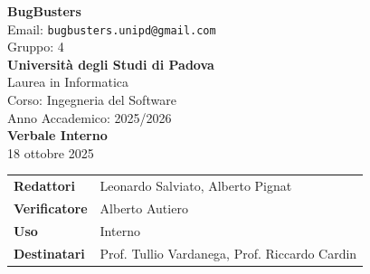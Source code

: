 \documentclass[a4paper,12pt]{article}
\begin{document}
\begin{center}  
  
  {\Large\bfseries\color{primaryblue} BugBusters}\\[0.3cm]
  {\small\color{darkgray} Email: \texttt{bugbusters.unipd@gmail.com}} \\[0.1cm]
  {\small\color{darkgray} Gruppo: 4} \\[0.5cm]

  {\large\bfseries Università degli Studi di Padova}\\[0.3cm]
  {\small Laurea in Informatica}\\[0.2cm]
  {\small Corso: Ingegneria del Software}\\[0.2cm]
  {\small Anno Accademico: 2025/2026}\\[0.8cm]

  {\Huge\bfseries\color{primaryblue} Verbale Interno}\\[0.3cm]
  {\Large\color{secondaryblue} 18 ottobre 2025}\\[0.8cm]
\end{center}

\begin{center}
\begin{tcolorbox}[colback=lightgray,colframe=primaryblue,width=0.85\textwidth,arc=3mm,boxrule=0.5pt]
\begin{tabular}{@{}ll@{}}
\textbf{Redattori}    & Leonardo Salviato, Alberto Pignat \\
\textbf{Verificatore}    & Alberto Autiero \\
\textbf{Uso}          & Interno \\
\textbf{Destinatari}  & Prof. Tullio Vardanega, Prof. Riccardo Cardin \\
\end{tabular}
\end{tcolorbox}
\end{center}
\end{document}
